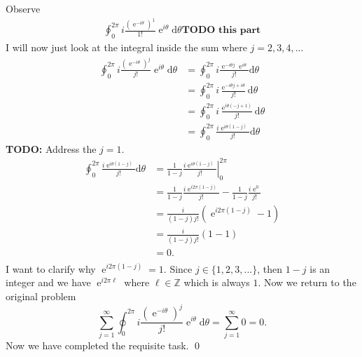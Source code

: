 \documentclass[10pt]{amsart}
\newcommand{\D}{\mathrm{d}}
\DeclareMathOperator{\E}{e}
\theoremstyle{nonumberplain}
\begin{document}
\begin{enumerate}[label={\bf {\arabic*}:}]
Observe
\begin{align*}
\oint_0^{2\pi} i \frac{\left(\E^{-i\theta}\right)^1}{1!} {\E^{i\theta}} \D \theta \textbf{TODO this part}
\end{align*}
I will now just look at the integral inside the sum where $j = 2, 3, 4, ...$
\begin{align*}
\oint_0^{2\pi} i \frac{\left(\E^{-i\theta}\right)^j}{j!} {\E^{i\theta}} \D \theta &= \oint_0^{2\pi} i \frac{\E^{-i\theta j}\E^{i\theta}}{j!} \D \theta \\
	&= \oint_0^{2\pi} i \frac{\E^{-i\theta j + i\theta}}{j!} \D \theta \\
	&=\oint_0^{2\pi} i \frac{\E^{i\theta\left( - j + 1\right)}}{j!} \D \theta \\
	&=\oint_0^{2\pi} \frac{i\E^{i\theta\left(1 - j\right)}}{j!} \D \theta
\end{align*}
\textbf{TODO:} Address the $j = 1$.
\begin{align*}
\oint_0^{2\pi} \frac{i\E^{i\theta\left(1 - j\right)}}{j!} \D \theta &= \left. \frac{1}{1 - j} \frac{i\E^{i\theta\left(1 - j\right)}}{j!} \right|_0^{2 \pi} \\
	&= \frac{1}{1 - j} \frac{i\E^{i2\pi\left(1 - j\right)}}{j!} - \frac{1}{1 - j} \frac{i\E^0}{j!} \\
	&= \frac{i}{\left(1 - j\right)j!}\left(\E^{i2\pi\left(1 - j\right)} - 1 \right) \\
	&= \frac{i}{\left(1 - j\right)j!}\left(1 - 1 \right) \\
	&= 0. \\
\end{align*}
I want to clarify why $\E^{i2\pi\left(1 - j\right)} = 1$.
Since $j \in \{1, 2, 3, ...\}$, then $1 - j$ is an integer and we have $\E^{i2\pi \ell}$ where $\ell \in \mathbb Z$ which is always $1$.
Now we return to the original problem
$$
\sum_{j=1}^{\infty} \oint_0^{2\pi} i \frac{\left(\E^{-i\theta}\right)^j}{j!} {\E^{i\theta}} \D \theta = \sum_{j=1}^{\infty} 0 = 0.
$$
Now we have completed the requisite task.
\qed
\\


\end{enumerate}
\end{document}
